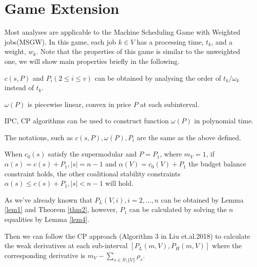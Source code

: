 \section{Game Extension}

Most analyses are applicable to the Machine Scheduling Game with Weighted jobs(MSGW).
In this game, each job $k \in V$ has a processing time, $t_k$, and a weight, $w_k$.
Note that the properties of this game is similar to the unweighted one, we will show main properties briefly in the following.

\begin{corollary} \label{cor-1}
$c(s,P)$ and $P_i(2 \leq i \leq v)$ can be obtained by analysing the order of $t_k/\omega_k$ instead of $t_k$.

\end{corollary}

\begin{corollary} \label{cor-2}
  $\omega(P)$ is piecewise linear, convex in price $P$ at each subinterval.
\end{corollary}

\begin{corollary} \label{cor-3}
  IPC, CP algorithms can be used to construct function $\omega(P)$ in polynomial time.
\end{corollary}

The notations, such as $c(s,P), \omega(P), P_i$ are the same as the above defined.

\begin{lem}\label{lem4}
When $c_0(s)$ satisfy the supermodular and $P=P_1$, where $m_V=1$, if $\alpha(s)=c(s)+P_1, \left| s \right|= n-1$ and $\alpha(V)=c_0(V)+P_1$ the budget balance constraint holds, the other coalitional stability constraints $\alpha(s) \leq c(s)+P_1, \left| s \right| < n-1$ will hold.
\end{lem}

As we've already known that $P_L(V,i), i = 2,\ldots,n$ can be obtained by Lemma \ref{lem1} and Theorem \ref{thm2}, however, $P_1$ can be calculated by solving the $n$ equalities by Lemma \ref{lem4}.

Then we can follow the CP approach (Algorithm 3 in Liu et.al.2018) to calculate the weak derivatives at each sub-interval $[P_L(m,V),P_H(m,V)]$ where the corresponding derivative is $m_V-\sum_{s\in S\setminus\{V\}} \rho_s$.

